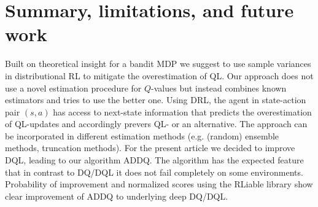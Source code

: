 \documentclass{article}
\newcommand{\cL}{\mathcal{L}}
\theoremstyle{plain}
\theoremstyle{definition}
\theoremstyle{remark}
\begin{document}



\newpage
\section{Summary, limitations, and future work}
Built on theoretical insight for a bandit MDP we suggest to use sample variances in distributional RL to mitigate  the overestimation of QL. Our approach does not use a novel estimation procedure for $Q$-values but instead combines known estimators and tries to use the better one. Using DRL, the agent in state-action pair $(s,a)$ has access to next-state information that predicts the overestimation of QL-updates and accordingly prevers QL- or an alternative. The approach can be incorporated in different estimation methods (e.g. (random) ensemble methods, truncation methods). For the present article we decided to improve DQL, leading to our algorithm ADDQ. The algorithm has the expected feature that in contrast to DQ/DQL it does not fail completely on some environments. Probability of improvement and normalized scores using the RLiable library show clear improvement of ADDQ to underlying deep DQ/DQL.
\end{document}

